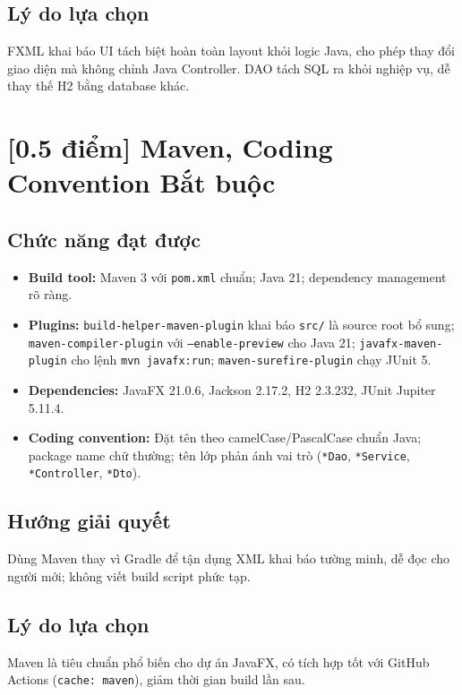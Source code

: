 \documentclass[12pt,a4paper]{article}
\newcommand{\score}[1]{\textbf{[#1 điểm]}}
\newcommand{\mandatory}{\textcolor{mandatorycolor}{\textbf{Bắt buộc}}}
\begin{document}
\subsection*{Lý do lựa chọn}
FXML khai báo UI tách biệt hoàn toàn layout khỏi logic Java, cho phép thay đổi giao diện mà không chỉnh Java Controller. DAO tách SQL ra khỏi nghiệp vụ, dễ thay thế H2 bằng database khác.

\section{\score{0.5} Maven, Coding Convention \hfill \mandatory}

\subsection*{Chức năng đạt được}

\begin{itemize}[leftmargin=1.5em]
  \item \textbf{Build tool:} Maven 3 với \texttt{pom.xml} chuẩn; Java 21; dependency management rõ ràng.
  \item \textbf{Plugins:}
    \texttt{build-helper-maven-plugin} khai báo \texttt{src/} là source root bổ sung;
    \texttt{maven-compiler-plugin} với \texttt{--enable-preview} cho Java 21;
    \texttt{javafx-maven-plugin} cho lệnh \texttt{mvn javafx:run};
    \texttt{maven-surefire-plugin} chạy JUnit 5.
  \item \textbf{Dependencies:} JavaFX 21.0.6, Jackson 2.17.2, H2 2.3.232, JUnit Jupiter 5.11.4.
  \item \textbf{Coding convention:} Đặt tên theo camelCase/PascalCase chuẩn Java; package name chữ thường; tên lớp phản ánh vai trò (\texttt{*Dao}, \texttt{*Service}, \texttt{*Controller}, \texttt{*Dto}).
\end{itemize}

\subsection*{Hướng giải quyết}
Dùng Maven thay vì Gradle để tận dụng XML khai báo tường minh, dễ đọc cho người mới; không viết build script phức tạp.

\subsection*{Lý do lựa chọn}
Maven là tiêu chuẩn phổ biến cho dự án JavaFX, có tích hợp tốt với GitHub Actions (\texttt{cache: maven}), giảm thời gian build lần sau.
\end{document}
